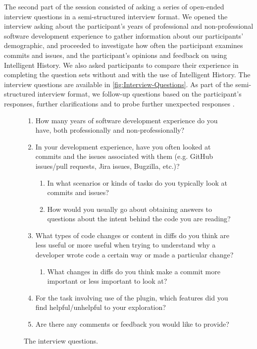 The second part of the session consisted of asking a series of open-ended interview questions 
in a semi-structured interview format.
We opened the interview  asking about the participant's years of professional and non-professional software
development experience to gather information about our participants' demographic,
and proceeded to investigate how often the participant examines commits and issues,
and  the participant's opinions and feedback on using Intelligent History.
We also asked participants to compare their experience in completing the question sets without and with the use of Intelligent History.
The interview questions are available in \autoref{fig:Interview-Questions}.
As part of the semi-structured interview format, 
we  follow-up questions based on the participant's responses,  further clarifications 
and to probe further  unexpected responses \cite{shull_guide_2007}. 

\begin{figure}[h]
  \begin{mdframed}
    \begin{enumerate}
      \item How many years of software development experience do you have, both professionally and non-professionally?
      \item In your development experience, have you often looked at commits and the issues associated with them (e.g. GitHub issues/pull requests, Jira issues, Bugzilla, etc.)?
          \begin{enumerate}
              \item In what scenarios or kinds of tasks do you typically look at commits and issues?
              \item How would you usually go about obtaining answers to questions about the intent behind the code you are reading?
          \end{enumerate}
      \item What types of code changes or content in diffs do you think are less useful or more useful when trying to understand why a developer wrote code a certain way or made a particular change? 
          \begin{enumerate}
              \item What changes in diffs do you think make a commit more important or less important to look at?
          \end{enumerate}
      \item For the task involving use of the plugin, which features did you find helpful/unhelpful to your exploration?
      \item Are there any comments or feedback you would like to provide?
    \end{enumerate}
\end{mdframed}
  \caption{The interview questions.}
  \label{fig:Interview-Questions}
\end{figure}

